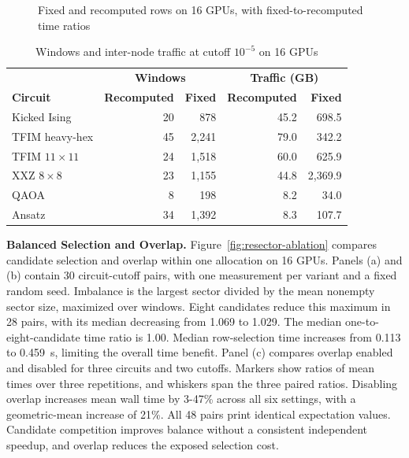 \begin{figure}[t]
\centering
{}\\[-2pt]
\hfill
{}\hfill
{}\\
\hfill
{}\hfill
{}
\caption{Fixed and recomputed rows on 16 GPUs, with fixed-to-recomputed time ratios}
\label{fig:fixedrows}
\end{figure}

\begin{table}[t]
\caption{Windows and inter-node traffic at cutoff $10^{-5}$ on 16 GPUs}
\label{tab:fixedrows}
\centering\small
\begin{tabular}{@{}lrrrr@{}}
\toprule
& \multicolumn{2}{c}{\textbf{Windows}} & \multicolumn{2}{c}{\textbf{Traffic (GB)}} \\
\textbf{Circuit} & \textbf{Recomputed} & \textbf{Fixed} & \textbf{Recomputed} & \textbf{Fixed} \\
\midrule
Kicked Ising & 20 & 878 & 45.2 & 698.5 \\
TFIM heavy-hex & 45 & 2,241 & 79.0 & 342.2 \\
TFIM $11\times11$ & 24 & 1,518 & 60.0 & 625.9 \\
XXZ $8\times8$ & 23 & 1,155 & 44.8 & 2,369.9 \\
QAOA & 8 & 198 & 8.2 & 34.0 \\
Ansatz & 34 & 1,392 & 8.3 & 107.7 \\
\bottomrule
\end{tabular}
\end{table}

\noindent\textbf{Balanced Selection and Overlap.}
Figure~\ref{fig:resector-ablation} compares candidate selection and overlap within one allocation on 16 GPUs.
Panels (a) and (b) contain 30 circuit-cutoff pairs, with one measurement per variant and a fixed random seed.
Imbalance is the largest sector divided by the mean nonempty sector size, maximized over windows.
Eight candidates reduce this maximum in 28 pairs, with its median decreasing from 1.069 to 1.029.
The median one-to-eight-candidate time ratio is 1.00.
Median row-selection time increases from 0.113 to 0.459~s, limiting the overall time benefit.
Panel (c) compares overlap enabled and disabled for three circuits and two cutoffs.
Markers show ratios of mean times over three repetitions, and whiskers span the three paired ratios.
Disabling overlap increases mean wall time by 3-47\% across all six settings, with a geometric-mean increase of 21\%.
All 48 pairs print identical expectation values.
Candidate competition improves balance without a consistent independent speedup, and overlap reduces the exposed selection cost.

